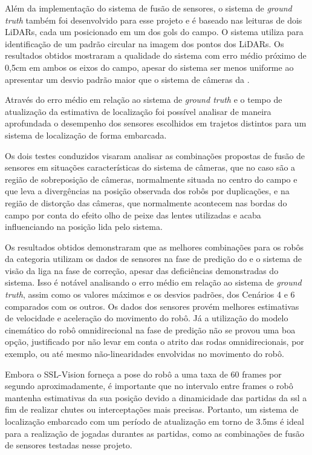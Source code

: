 \documentclass[acronym, symbols, table]{fei}
\begin{document}
	Além da implementação do sistema de fusão de sensores, o sistema de \textit{ground truth} também foi desenvolvido para esse projeto e é baseado nas leituras de dois LiDARs, cada um posicionado em um dos gols do campo. O sistema utiliza  para identificação de um padrão circular na imagem dos pontos dos LiDARs. Os resultados obtidos mostraram a qualidade do sistema com erro médio próximo de 0,5cm em ambos os eixos do campo, apesar do sistema ser menos uniforme ao apresentar um desvio padrão maior que o sistema de câmeras da .
	
	Através do erro médio em relação ao sistema de \textit{ground truth} e o tempo de atualização da estimativa de localização foi possível analisar de maneira aprofundada o desempenho dos sensores escolhidos em trajetos distintos para um sistema de localização de forma embarcada.
	
	Os dois testes conduzidos visaram analisar as combinações propostas de fusão de sensores em situações características do sistema de câmeras, que no caso são a região de sobreposição de câmeras, normalmente situada no centro do campo e que leva a divergências na posição observada dos robôs por duplicações, e na região de distorção das câmeras, que normalmente acontecem nas bordas do campo por conta do efeito olho de peixe das lentes utilizadas e acaba influenciando na posição lida pelo sistema.
	
	Os resultados obtidos demonstraram que as melhores combinações para os robôs da categoria  utilizam os dados de sensores na fase de predição do  e o sistema de visão da liga na fase de correção, apesar das deficiências demonstradas do sistema. Isso é notável analisando o erro médio em relação ao sistema de \textit{ground truth}, assim como os valores máximos e os desvios padrões, dos Cenários 4 e 6 comparados com os outros. Os dados dos sensores provém melhores estimativas de velocidade e aceleração do movimento do robô. Já a utilização do modelo cinemático do robô omnidirecional na fase de predição não se provou uma boa opção, justificado por não levar em conta o atrito das rodas omnidirecionais, por exemplo, ou até mesmo não-linearidades envolvidas no movimento do robô.
	
	Embora o SSL-Vision forneça a pose do robô a uma taxa de 60 frames por segundo aproximadamente, é importante que no intervalo entre frames o robô mantenha estimativas da sua posição devido a dinamicidade das partidas da \acrshort{ssl} a fim de realizar chutes ou interceptações mais precisas. Portanto, um sistema de localização embarcado com um período de atualização em torno de 3.5ms é ideal para a realização de jogadas durantes as partidas, como as combinações de fusão de sensores testadas nesse projeto.
	
\end{document}
